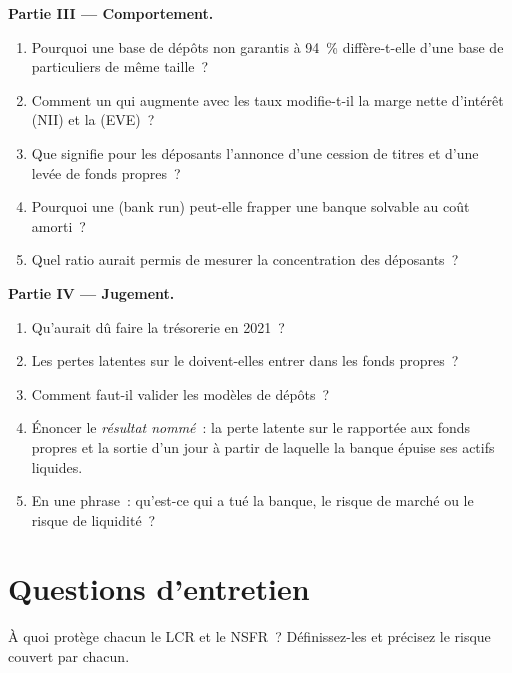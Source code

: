 \begin{problem}
\medskip\noindent\textbf{Partie III --- Comportement.}
\begin{enumerate}[resume]
\item Pourquoi une base de dépôts non garantis à 94~\% diffère-t-elle d'une base de particuliers de même taille~?
\item Comment un  qui augmente avec les taux modifie-t-il la marge nette d'intérêt (NII) et la  (EVE)~?
\item Que signifie pour les déposants l'annonce d'une cession de titres et d'une levée de fonds propres~?
\item Pourquoi une  (bank run) peut-elle frapper une banque solvable au coût amorti~?
\item Quel ratio aurait permis de mesurer la concentration des déposants~?
\end{enumerate}

\medskip\noindent\textbf{Partie IV --- Jugement.}
\begin{enumerate}[resume]
\item Qu'aurait dû faire la trésorerie en 2021~?
\item Les pertes latentes sur le  doivent-elles entrer dans les fonds propres~?
\item Comment faut-il valider les modèles de dépôts~?
\item Énoncer le \emph{résultat nommé}~: la perte latente sur le  rapportée aux fonds propres et
la sortie d'un jour à partir de laquelle la banque épuise ses actifs liquides.
\item En une phrase~: qu'est-ce qui a tué la banque, le risque de marché ou le risque de liquidité~?
\end{enumerate}
\end{problem}

\section{Questions d'entretien}

\begin{interviewq}\label{iq:rc:liquidity-and-funding-risk-bank-treasury:1}
À quoi protège chacun le LCR et le NSFR~? Définissez-les et précisez le risque couvert par chacun.
\end{interviewq}

